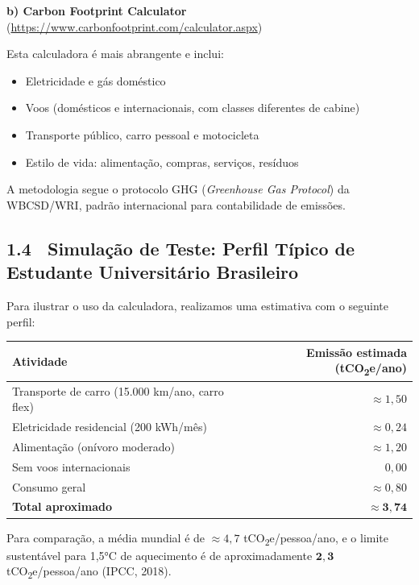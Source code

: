 \documentclass[12pt,a4paper]{article}
\begin{document}
\textbf{b) Carbon Footprint Calculator}
(\url{https://www.carbonfootprint.com/calculator.aspx})

Esta calculadora é mais abrangente e inclui:
\begin{itemize}
  \item Eletricidade e gás doméstico
  \item Voos (domésticos e internacionais, com classes diferentes de cabine)
  \item Transporte público, carro pessoal e motocicleta
  \item Estilo de vida: alimentação, compras, serviços, resíduos
\end{itemize}

A metodologia segue o protocolo GHG (\textit{Greenhouse Gas Protocol}) da WBCSD/WRI,
padrão internacional para contabilidade de emissões.

\bigskip

\subsection*{1.4 \ Simulação de Teste: Perfil Típico de Estudante Universitário Brasileiro}

Para ilustrar o uso da calculadora, realizamos uma estimativa com o seguinte perfil:

\begin{center}
\renewcommand{\arraystretch}{1.4}
\begin{tabular}{l r}
  \toprule
  \textbf{Atividade} & \textbf{Emissão estimada (tCO\textsubscript{2}e/ano)} \\ \midrule
  Transporte de carro (15.000 km/ano, carro flex) & $\approx 1{,}50$ \\
  Eletricidade residencial (200 kWh/mês) & $\approx 0{,}24$ \\
  Alimentação (onívoro moderado) & $\approx 1{,}20$ \\
  Sem voos internacionais & $0{,}00$ \\
  Consumo geral & $\approx 0{,}80$ \\ \midrule
  \textbf{Total aproximado} & $\approx \mathbf{3{,}74}$ \\ \bottomrule
\end{tabular}
\end{center}

\medskip
Para comparação, a média mundial é de $\approx 4{,}7$ tCO\textsubscript{2}e/pessoa/ano,
e o limite sustentável para 1,5°C de aquecimento é de aproximadamente
$\mathbf{2{,}3}$ tCO\textsubscript{2}e/pessoa/ano (IPCC, 2018).
\end{document}
